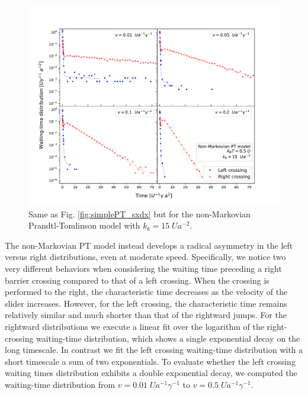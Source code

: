 \begin{figure}
\centering
\includegraphics[width=\textwidth]{isto_sxdx_kb15_basseV.pdf}
\caption{Same as Fig. \ref{fig:simplePT_sxdx} but for the non-Markovian Prandtl-Tomlinson model with $k_b=15\; Ua^{-2}$.}
\label{fig:sxdx_kb15_basseV}
\end{figure}
The non-Markovian PT model instead develops a radical asymmetry in the left versus right distributions, even at moderate speed. Specifically, we notice two very different behaviors when considering the waiting time preceding a right barrier crossing compared to that of a left crossing. When the crossing is performed to the right, the characteristic time decreases as the velocity of the slider increases. However, for the left crossing, the characteristic time remains relatively similar and much shorter than that of the rightward jumps. For the rightward distributions we execute a linear fit over the logarithm of the right-crossing waiting-time distribution, which shows a single exponential decay on the long timescale. In contrast we fit the left crossing waiting-time distribution with a short timescale a sum of two exponentials. To evaluate whether the left crossing waiting times distribution exhibits a double exponential decay,
we computed the waiting-time distribution from $v=0.01\; Ua^{-1}\gamma^{-1}$ to $v=0.5\; Ua^{-1}\gamma^{-1}$.

